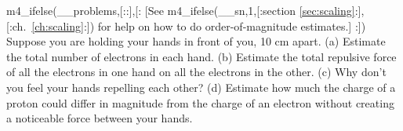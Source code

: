 m4_ifelse(__problems,[::],[:%
[See m4_ifelse(__sn,1,[:section \ref{sec:scaling}:],[:ch.~\ref{ch:scaling}:])
for help on how to do order-of-magnitude
estimates.]%
:])%
        Suppose you are holding your hands in front of you, 10 cm apart.\hwendpart
        (a) Estimate the total number of electrons in each hand.\answercheck\hwendpart
        (b) Estimate the total repulsive force of all the electrons
        in one hand on all the electrons in the other.\answercheck\hwendpart
        (c) Why don't you feel your hands repelling each other?\hwendpart
        (d) Estimate how much the charge of a proton could differ in
        magnitude from the charge of an electron without creating a
        noticeable force between your hands.
